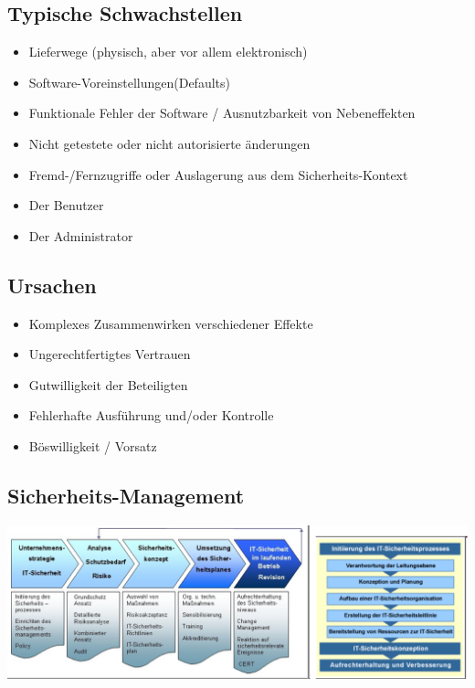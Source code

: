 \documentclass[a4paper, 10pt]{article}
\begin{document}
\subsection{Typische Schwachstellen}
\begin{itemize}
	\item Lieferwege (physisch, aber vor allem elektronisch)
	\item Software-Voreinstellungen(Defaults)
	\item Funktionale Fehler der Software / Ausnutzbarkeit von Nebeneffekten
	\item Nicht getestete oder nicht autorisierte \"anderungen
	\item Fremd-/Fernzugriffe oder Auslagerung aus dem Sicherheits-Kontext
	\item Der Benutzer
	\item Der Administrator
\end{itemize}
\subsection{Ursachen}
\begin{itemize}
	\item Komplexes Zusammenwirken verschiedener Effekte
	\item Ungerechtfertigtes Vertrauen
	\item Gutwilligkeit der Beteiligten
	\item Fehlerhafte Ausf\"uhrung und/oder Kontrolle
	\item Böswilligkeit / Vorsatz
\end{itemize}
\subsection{Sicherheits-Management}
\includegraphics[scale=0.35]{sicherheits_management.png}
\end{document}
